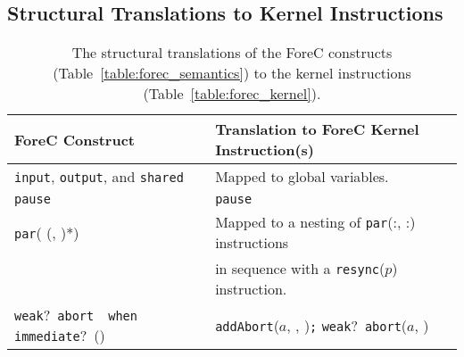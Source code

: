 
\subsection{Structural Translations to Kernel Instructions}
\label{sec:formalSemantics_translations}

\begin{table}
	\centering
	\renewcommand{\arraystretch}{1.25}
	
	\begin{tabular}{| l | l |}
		\hline
		\bf{ForeC Construct}														& \bf{Translation to ForeC Kernel Instruction(s)}												\\ \hline
		\verb$input$, \verb$output$, and \verb$shared$								& Mapped to global variables.																	\\ \hline
		\verb$pause$																& \verb$pause$																					\\ \hline
		\verb$par$(\body{} (, \body{})*)											& Mapped to a nesting of \verb$par$(\thread{}:\body{}, \thread{}:\body{}) instructions			\\
																					& in sequence with a \verb$resync$($p$) instruction.											\\ \hline
		\verb$weak$?~\verb$abort$~\body{}~\verb$when immediate$?~(\expression{})	& \verb$addAbort$($a$, \imm{}, \expression{})\verb$;$ \verb$weak$?~\verb$abort$($a$, \body{})	\\ \hline
	\end{tabular}
	
	\caption{The structural translations of the ForeC constructs  
			 (Table~\ref{table:forec_semantics}) to the kernel instructions 
			 (Table~\ref{table:forec_kernel}).}
	\label{table:forec_structural_translations}
\end{table}

